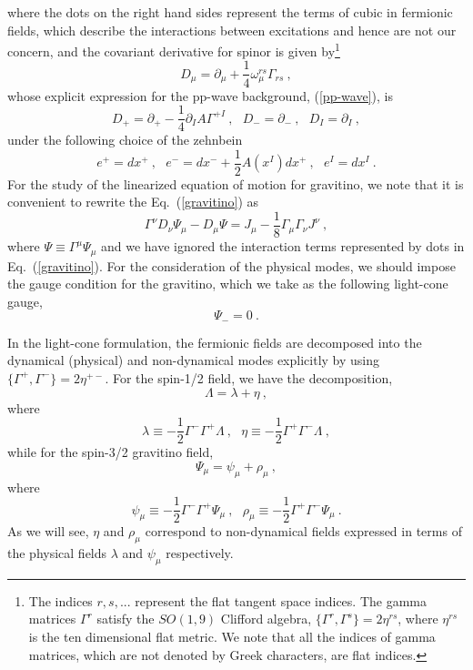 \documentclass[a4paper,12pt]{article}
\numberwithin{equation}{section}
\begin{document}
where the dots on the right hand sides represent the terms of cubic in
fermionic fields, which describe the interactions between excitations
and hence are not our concern, and the covariant derivative for spinor
is given by\footnote{The indices $r,s,...$ represent the flat tangent
  space indices.  The gamma matrices $\Gamma^r$ satisfy the $SO(1,9)$
  Clifford algebra, $\{ \Gamma^r, \Gamma^s \} = 2 \eta^{rs}$, where
  $\eta^{rs}$ is the ten dimensional flat metric. We note that all the
  indices of gamma matrices, which are not denoted by Greek
  characters, are flat indices.}
\begin{equation}
D_\mu = \partial_\mu + \frac{1}{4} \omega_\mu^{rs} \Gamma_{rs} ~,
\end{equation}
whose explicit expression for the pp-wave background, (\ref{pp-wave}),
is
\begin{equation}
D_+ = \partial_+ - \frac{1}{4} \partial_I A \Gamma^{+I} ~,~~~
D_- = \partial_- ~,~~~
D_I = \partial_I ~,
\end{equation}
under the following choice of the zehnbein
\begin{equation}
e^+ = dx^+ ~,~~~
e^- = dx^- + \frac{1}{2} A(x^I) dx^+ ~,~~~
e^I = dx^I ~.
\label{pp}
\end{equation}
For the study of the linearized equation of motion for gravitino, we
note that it is convenient to rewrite the Eq.~(\ref{gravitino}) as
\begin{equation}
\Gamma^\nu  D_\nu \Psi_\mu - D_\mu \Psi
 = J_\mu - \frac{1}{8} \Gamma_\mu \Gamma_\nu J^\nu ~,
\label{s3/2}
\end{equation}
where $\Psi \equiv \Gamma^\mu \Psi_\mu$ and we have ignored the
interaction terms represented by dots in Eq.~(\ref{gravitino}).  For
the consideration of the physical modes, we should impose the gauge
condition for the gravitino, which we take as the following light-cone
gauge,
\begin{equation}
\Psi_- = 0 ~.
\label{f-gauge}
\end{equation}

In the light-cone formulation, the fermionic fields are decomposed into
the dynamical (physical) and non-dynamical modes explicitly by using
$\{ \Gamma^+ , \Gamma^- \} = 2 \eta^{+-}$.  For the spin-1/2 field, we
have the decomposition,
\begin{equation}
\Lambda = \lambda + \eta ~,
\label{d1/2}
\end{equation}
where
\begin{equation}
\lambda \equiv - \frac{1}{2} \Gamma^- \Gamma^+ \Lambda ~,~~~
\eta \equiv - \frac{1}{2} \Gamma^+ \Gamma^- \Lambda ~,
\label{d1/2-d}
\end{equation}
while for the spin-3/2 gravitino field,
\begin{equation}
\Psi_\mu = \psi_\mu + \rho_\mu~,
\label{d3/2}
\end{equation}
where
\begin{equation}
\psi_\mu \equiv - \frac{1}{2} \Gamma^- \Gamma^+ \Psi_\mu ~,~~~
\rho_\mu \equiv - \frac{1}{2} \Gamma^+ \Gamma^- \Psi_\mu ~.
\label{d3/2-d}
\end{equation}
As we will see, $\eta$ and $\rho_\mu$ correspond to non-dynamical
fields expressed in terms of the physical fields $\lambda$ and
$\psi_\mu$ respectively.
\end{document}
